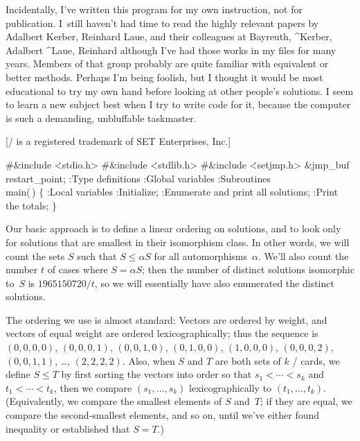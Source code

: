 Incidentally, I've written this program for my own instruction, not for
publication. I~still haven't had time to read the highly relevant
papers by Adalbert Kerber, Reinhard Laue, and their colleagues at Bayreuth,
^{Kerber, Adalbert}
^{Laue, Reinhard}
although I've
had those works in my files for many years. Members of that group
probably are quite familiar with equivalent or better methods.
Perhaps I'm being foolish, but I thought it would be most educational to try
my own hand before looking at other people's solutions. I seem to learn a new
subject best when I try to write code for it, because the computer is
such a demanding, unbluffable taskmaster.

[\SET/ is a registered trademark of SET Enterprises, Inc.]

\Y\B\8\#\&{include} \.{<stdio.h>}\6
\8\#\&{include} \.{<stdlib.h>}\6
\8\#\&{include} \.{<setjmp.h>}\6
\&{jmp\_buf} \\{restart\_point};\7
:Type definitions\X\6
:Global variables\X\6
:Subroutines\X\7
\\{main}(\,)\1\1\2\2\6
${}\{{}$\1\6
:Local variables\X\6
:Initialize\X;\6
:Enumerate and print all solutions\X;\6
:Print the totals\X;\6
\4${}\}{}$\2\par
\fi

Our basic approach is to define a linear ordering on
solutions, and to
look only for solutions that are smallest in their isomorphism class.
In other words, we will count the sets $S$ such that $S\le\alpha S$ for
all automorphisms~$\alpha$. We'll also count the number $t$ of cases where
$S=\alpha S$; then the number of distinct solutions isomorphic to~$S$
is $1965150720/t$, so we will essentially have also enumerated the distinct
solutions.

The ordering we use is almost standard: Vectors are ordered
by weight, and vectors of equal weight are ordered lexicographically;
thus the sequence is $(0,0,0,0)$, $(0,0,0,1)$, $(0,0,1,0)$, $(0,1,0,0)$,
$(1,0,0,0)$, $(0,0,0,2)$, $(0,0,1,1)$, \dots, $(2,2,2,2)$.
Also, when $S$ and $T$ are both sets of $k$ \SET/ cards, we define
$S\le T$ by first sorting the vectors into order so that $s_1<\cdots<s_k$ and
$t_1<\cdots<t_k$, then we compare $(s_1,\ldots,s_k)$ lexicographically
to $(t_1,\ldots,t_k)$. (Equivalently, we compare the smallest elements
of $S$ and~$T$; if they are equal, we compare the second-smallest elements,
and so on, until we've either found inequality or established that $S=T$.)

\fi

